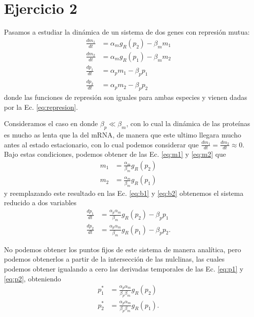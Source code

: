 \clearpage
\section*{Ejercicio 2}

Pasamos a estudiar la dinámica de un sistema de dos genes con represión mutua:
\begin{align}
    \frac{dm_1}{dt} &= \alpha_m g_R \left( p_2 \right) - \beta_m m_1 \label{eq:m1} \\
    \frac{dm_2}{dt} &= \alpha_m g_R \left( p_1 \right) - \beta_m m_2 \label{eq:m2}\\
    \frac{dp_1}{dt} &= \alpha_p m_1 - \beta_p p_1 \label{eq:b1}\\
    \frac{dp_2}{dt} &= \alpha_p m_2 - \beta_p p_2 \label{eq:b2}
\end{align}
donde las funciones de represión son iguales para ambas especies y vienen dadas por la Ec. \ref{eq:represion}.

Consideramos el caso en donde $\beta_p \ll \beta_m$, con lo cual la dinámica de las proteínas es mucho as lenta que la del mRNA, de manera que este ultimo llegara mucho antes al estado estacionario, con lo cual podemos considerar que $\frac{dm_1}{dt} = \frac{dm_2}{dt} \approx 0$. Bajo estas condiciones, podemos obtener de las Ec. \ref{eq:m1} y \ref{eq:m2} que
\begin{align}
    m_1 &= \frac{\alpha_m}{\beta_m} g_R \left( p_2 \right) \\
    m_2 &= \frac{\alpha_m}{\beta_m} g_R \left( p_1 \right)
\end{align}
y reemplazando este resultado en las Ec.  \ref{eq:b1} y \ref{eq:b2} obtenemos el sistema reducido a dos variables
\begin{align}
    \frac{dp_1}{dt} &= \frac{\alpha_p \alpha_m}{\beta_m} g_R \left( p_2 \right) - \beta_p p_1 \label{eq:p1}\\
    \frac{dp_2}{dt} &= \frac{\alpha_p \alpha_m}{\beta_m} g_R \left( p_1 \right) - \beta_p p_2 \label{eq:p2}.
\end{align}

No podemos obtener los puntos fijos de este sistema de manera analítica, pero podemos obtenerlos a partir de la intersección de las nulclinas, las cuales podemos obtener igualando a cero las derivadas temporales de las Ec. \ref{eq:p1} y \ref{eq:p2}, obteniendo
\begin{align}
    p_1^* &= \frac{\alpha_p \alpha_m}{\beta_p \beta_m} g_R \left(p_2 \right) \\
    p_2^* &= \frac{\alpha_p \alpha_m}{\beta_p \beta_m} g_R \left(p_1 \right).
\end{align}

